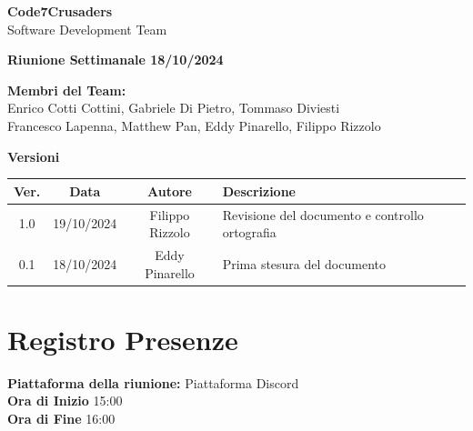 \documentclass{article}
\begin{document}
\begin{titlepage}
    {\Huge \textbf{Code7Crusaders}}\\
    \vspace{0.5cm}
    {\Large Software Development Team}\\
    \vspace{2cm}
    
    {\large \textbf{Riunione Settimanale 18/10/2024}}\\
    \vspace{5cm}

    \textbf{Membri del Team:}\\
    Enrico Cotti Cottini, Gabriele Di Pietro, Tommaso Diviesti \\
    Francesco Lapenna, Matthew Pan, Eddy Pinarello, Filippo Rizzolo \\
    \vspace{0.5cm}
    
    \vspace{1cm}
\end{titlepage}

\newpage
\begin{table}[h!]
\centering
\textbf{Versioni} \\ %
\vspace{2mm} %
\begin{tabular}{|c|c|c|l|}
    \hline
    \textbf{Ver.} & \textbf{Data} & \textbf{Autore} & \textbf{Descrizione} \\
    \hline
    1.0 & 19/10/2024 & Filippo Rizzolo & Revisione del documento e controllo ortografia \\ 
    \hline
    0.1 & 18/10/2024 & Eddy Pinarello & Prima stesura del documento \\ 
    \hline
\end{tabular}
\end{table}

\newpage
\tableofcontents
\newpage

\section{Registro Presenze}
\textbf{Piattaforma della riunione:} Piattaforma Discord \\
\textbf{Ora di Inizio} 15:00\\
\textbf{Ora di Fine} 16:00
\vspace{10mm} 
\end{document}
